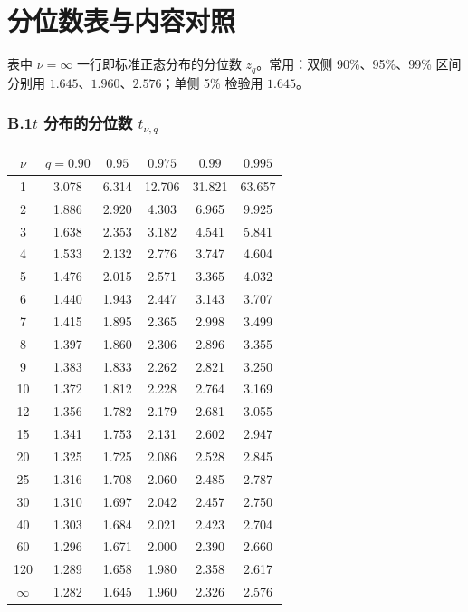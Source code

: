 \chapter{分位数表与内容对照}
\label{app:tables}

表中 $\nu=\infty$ 一行即标准正态分布的分位数 $z_q$。常用：双侧 90\%、95\%、99\% 区间分别用 $1.645$、$1.960$、$2.576$；单侧 5\% 检验用 $1.645$。

\noindent
\begin{minipage}[t]{0.56\linewidth}
\subsection*{B.1\quad \texorpdfstring{$t$}{t} 分布的分位数 \texorpdfstring{$t_{\nu,q}$}{t(ν,q)}}
\footnotesize\linespread{1.0}\selectfont\renewcommand{\arraystretch}{1.08}
\begin{tabular}{c*{5}{c}}
\toprule
$\nu$ & $q=0.90$ & $0.95$ & $0.975$ & $0.99$ & $0.995$\\
\midrule
1 & 3.078 & 6.314 & 12.706 & 31.821 & 63.657 \\
2 & 1.886 & 2.920 & 4.303 & 6.965 & 9.925 \\
3 & 1.638 & 2.353 & 3.182 & 4.541 & 5.841 \\
4 & 1.533 & 2.132 & 2.776 & 3.747 & 4.604 \\
5 & 1.476 & 2.015 & 2.571 & 3.365 & 4.032 \\
6 & 1.440 & 1.943 & 2.447 & 3.143 & 3.707 \\
7 & 1.415 & 1.895 & 2.365 & 2.998 & 3.499 \\
8 & 1.397 & 1.860 & 2.306 & 2.896 & 3.355 \\
9 & 1.383 & 1.833 & 2.262 & 2.821 & 3.250 \\
10 & 1.372 & 1.812 & 2.228 & 2.764 & 3.169 \\
12 & 1.356 & 1.782 & 2.179 & 2.681 & 3.055 \\
15 & 1.341 & 1.753 & 2.131 & 2.602 & 2.947 \\
20 & 1.325 & 1.725 & 2.086 & 2.528 & 2.845 \\
25 & 1.316 & 1.708 & 2.060 & 2.485 & 2.787 \\
30 & 1.310 & 1.697 & 2.042 & 2.457 & 2.750 \\
40 & 1.303 & 1.684 & 2.021 & 2.423 & 2.704 \\
60 & 1.296 & 1.671 & 2.000 & 2.390 & 2.660 \\
120 & 1.289 & 1.658 & 1.980 & 2.358 & 2.617 \\
$\infty$ & 1.282 & 1.645 & 1.960 & 2.326 & 2.576 \\
\bottomrule
\end{tabular}
\end{minipage}\hfill
